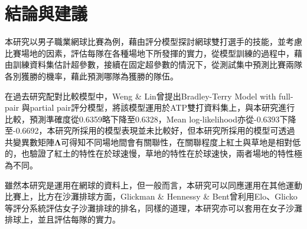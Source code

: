 \documentclass[12pt]{article}
\begin{document}
\section{結論與建議}
本研究以男子職業網球比賽為例，藉由評分模型探討網球雙打選手的技能，並考慮比賽場地的因素，評估每隊在各種場地下所發揮的實力，從模型訓練的過程中，藉由訓練資料集估計超參數，接續在固定超參數的情況下，從測試集中預測比賽兩隊各別獲勝的機率，藉此預測哪隊為獲勝的隊伍。

在過去研究配對比較模型中，Weng \& Lin曾提出Bradley-Terry Model with full-pair 與partial pair\cite{JMLR:v12:weng11a}評分模型，將該模型運用於ATP雙打資料集上，與本研究進行比較，預測準確度從0.6359略下降至0.6328，Mean log-likelihood亦從-0.6393下降至-0.6692，本研究所採用的模型表現並未比較好，但本研究所採用的模型可透過共變異數矩陣$\boldsymbol{\Lambda}$可得知不同場地間會有關聯性，在關聯程度上紅土與草地是相對低的，也驗證了紅土的特性在於球速慢，草地的特性在於球速快，兩者場地的特性極為不同。



雖然本研究是運用在網球的資料上，但一般而言，本研究可以同應運用在其他運動比賽上，比方在沙灘排球方面，Glickman \& Hennessy \& Bent\cite{glickman2018comparison}曾利用Elo、Glicko等評分系統評估女子沙灘排球的排名，同樣的道理，本研究亦可以套用在女子沙灘排球上，並且評估每隊的實力。

\end{document}
